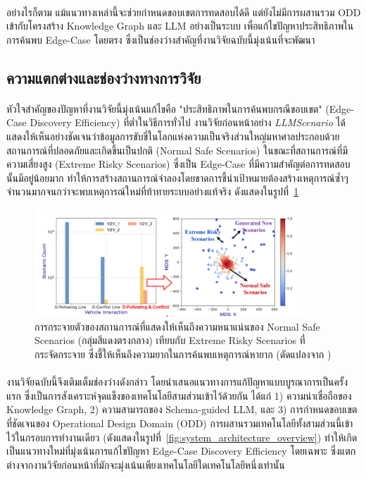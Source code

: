 \paragraph{}
อย่างไรก็ตาม แม้แนวทางเหล่านี้จะช่วยกำหนดขอบเขตการทดสอบได้ดี แต่ยังไม่มีการผสานรวม ODD เข้ากับโครงสร้าง Knowledge Graph และ LLM อย่างเป็นระบบ เพื่อแก้ไขปัญหาประสิทธิภาพในการค้นพบ Edge-Case โดยตรง ซึ่งเป็นช่องว่างสำคัญที่งานวิจัยฉบับนี้มุ่งเน้นที่จะพัฒนา
\subsection{ความแตกต่างและช่องว่างทางการวิจัย}
\paragraph{}
หัวใจสำคัญของปัญหาที่งานวิจัยนี้มุ่งเน้นแก้ไขคือ "ประสิทธิภาพในการค้นพบกรณีขอบเขต" (Edge-Case Discovery Efficiency) ที่ต่ำในวิธีการทั่วไป งานวิจัยก่อนหน้าอย่าง \textit{LLMScenario} ได้แสดงให้เห็นอย่างชัดเจนว่าข้อมูลการขับขี่ในโลกแห่งความเป็นจริงส่วนใหญ่มหาศาลประกอบด้วยสถานการณ์ที่ปลอดภัยและเกิดขึ้นเป็นปกติ (Normal Safe Scenarios) ในขณะที่สถานการณ์ที่มีความเสี่ยงสูง (Extreme Risky Scenarios) ซึ่งเป็น Edge-Case ที่มีความสำคัญต่อการทดสอบนั้นมีอยู่น้อยมาก \cite{chang2023llmscenario} ทำให้การสร้างสถานการณ์จำลองโดยขาดการชี้นำเป้าหมายต้องสร้างเหตุการณ์ซ้ำๆ จำนวนมากจนกว่าจะพบเหตุการณ์ใหม่ที่ท้าทายระบบอย่างแท้จริง ดังแสดงในรูปที่~\ref{fig:llmscenario_distribution}

\begin{figure}[htbp]
    \centering
    \includegraphics[width=0.9\textwidth]{images/llmscenario-distribution}
    \caption{การกระจายตัวของสถานการณ์ที่แสดงให้เห็นถึงความหนาแน่นของ Normal Safe Scenarios (กลุ่มสีแดงตรงกลาง) เทียบกับ Extreme Risky Scenarios ที่กระจัดกระจาย ซึ่งชี้ให้เห็นถึงความยากในการค้นพบเหตุการณ์หายาก (ดัดแปลงจาก \cite{chang2023llmscenario})}
    \label{fig:llmscenario_distribution}
\end{figure}

\paragraph{}
งานวิจัยฉบับนี้จึงเติมเต็มช่องว่างดังกล่าว โดยนำเสนอแนวทางการแก้ปัญหาแบบบูรณาการเป็นครั้งแรก ซึ่งเป็นการสังเคราะห์จุดแข็งของเทคโนโลยีสามส่วนเข้าไว้ด้วยกัน ได้แก่ 1) ความน่าเชื่อถือของ Knowledge Graph, 2) ความสามารถของ Schema-guided LLM, และ 3) การกำหนดขอบเขตที่ชัดเจนของ Operational Design Domain (ODD) การผสานรวมเทคโนโลยีทั้งสามส่วนนี้เข้าไว้ในกรอบการทำงานเดียว (ดังแสดงในรูปที่~\ref{fig:system_architecture_overview}) ทำให้เกิดเป็นแนวทางใหม่ที่มุ่งเน้นการแก้ไขปัญหา Edge-Case Discovery Efficiency โดยเฉพาะ ซึ่งแตกต่างจากงานวิจัยก่อนหน้าที่มักจะมุ่งเน้นเพียงเทคโนโลยีใดเทคโนโลยีหนึ่งเท่านั้น

